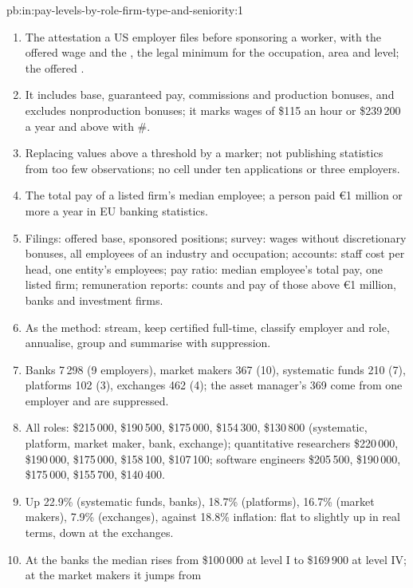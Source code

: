 \begin{solution}{pb:in:pay-levels-by-role-firm-type-and-seniority:1}
\begin{enumerate}
\item The attestation a US employer files before sponsoring a worker, with the offered wage and the , the
legal minimum for the occupation, area and level; the offered .
\item It includes base, guaranteed pay, commissions and production bonuses, and excludes nonproduction bonuses; it marks
wages of \$115 an hour or \$239\,200 a year and above with \#.
\item Replacing values above a threshold by a marker; not publishing statistics from too few observations; no cell under
ten applications or three employers.
\item The total pay of a listed firm's median employee; a person paid \euro1 million or more a year in EU banking
statistics.
\item Filings: offered base, sponsored positions; survey: wages without discretionary bonuses, all employees of an
industry and occupation; accounts: staff cost per head, one entity's employees; pay ratio: median employee's total pay,
one listed firm; remuneration reports: counts and pay of those above \euro1 million, banks and investment firms.
\item As the method: stream, keep certified full-time, classify employer and role, annualise, group and summarise with
suppression.
\item Banks 7\,298 (9 employers), market makers 367 (10), systematic funds 210 (7), platforms 102 (3), exchanges 462
(4); the asset manager's 369 come from one employer and are suppressed.
\item All roles: \$215\,000, \$190\,500, \$175\,000, \$154\,300, \$130\,800 (systematic, platform, market maker, bank,
exchange); quantitative researchers \$220\,000, \$190\,000, \$175\,000, \$158\,100, \$107\,100; software engineers
\$205\,500, \$190\,000, \$175\,000, \$155\,700, \$140\,400.
\item Up 22.9\% (systematic funds, banks), 18.7\% (platforms), 16.7\% (market makers), 7.9\% (exchanges), against
18.8\% inflation: flat to slightly up in real terms, down at the exchanges.
\item At the banks the median rises from \$100\,000 at level I to \$169\,900 at level IV; at the market makers it jumps from

\end{enumerate}
\end{solution}
